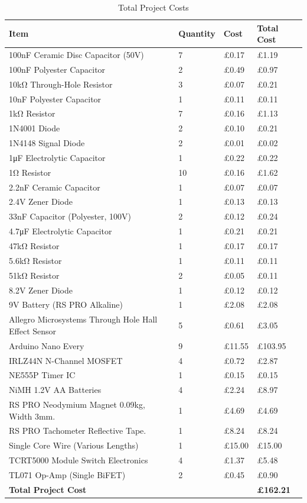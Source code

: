 \documentclass[11pt,a4paper, margin=20mm]{report}
\begin{document}
\begin{table}[H]
\centering
\caption{Total Project Costs}
\label{tab:cots_tot}
\begin{tabular}{|l ||l |l |l|} \hline 
\textbf{Item} & \textbf{Quantity} & \textbf{Cost} & \textbf{Total Cost} \\ \hline 
100nF Ceramic Disc Capacitor (50V) & 7 & £0.17 & £1.19 \\ \hline 
100nF Polyester Capacitor & 2 & £0.49 & £0.97 \\ \hline 
10kΩ Through-Hole Resistor & 3 & £0.07 & £0.21 \\ \hline 
10nF Polyester Capacitor & 1 & £0.11 & £0.11 \\ \hline 
1kΩ Resistor & 7 & £0.16 & £1.13 \\ \hline 
1N4001 Diode & 2 & £0.10 & £0.21 \\ \hline 
1N4148 Signal Diode & 2 & £0.01 & £0.02 \\ \hline 
1μF Electrolytic Capacitor & 1 & £0.22 & £0.22 \\ \hline 
1Ω Resistor & 10 & £0.16 & £1.62 \\ \hline 
2.2nF Ceramic Capacitor & 1 & £0.07 & £0.07 \\ \hline 
2.4V Zener Diode & 1 & £0.13 & £0.13 \\ \hline 
33nF Capacitor (Polyester, 100V) & 2 & £0.12 & £0.24 \\ \hline 
4.7μF Electrolytic Capacitor & 1 & £0.21 & £0.21 \\ \hline 
47kΩ Resistor  & 1 & £0.17 & £0.17 \\ \hline 
5.6kΩ Resistor & 1 & £0.11 & £0.11 \\ \hline 
51kΩ Resistor & 2 & £0.05 & £0.11 \\ \hline 
8.2V Zener Diode & 1 & £0.12 & £0.12 \\ \hline 
9V Battery (RS PRO Alkaline) & 1 & £2.08 & £2.08 \\ \hline 
Allegro Microsystems Through Hole Hall Effect Sensor & 5 & £0.61 & £3.05 \\ \hline 
Arduino Nano Every & 9 & £11.55 & £103.95 \\ \hline 
IRLZ44N N-Channel MOSFET & 4 & £0.72 & £2.87 \\ \hline 
NE555P Timer IC & 1 & £0.15 & £0.15 \\ \hline 
NiMH 1.2V AA Batteries & 4 & £2.24 & £8.97 \\ \hline 
RS PRO Neodymium Magnet 0.09kg, Width 3mm. & 1 & £4.69 & £4.69 \\ \hline 
RS PRO Tachometer Reflective Tape. & 1 & £8.24 & £8.24 \\ \hline 
Single Core Wire (Various Lengths) & 1 & £15.00 & £15.00 \\ \hline 
TCRT5000 Module Switch Electronics & 4 & £1.37 & £5.48 \\ \hline 
TL071 Op-Amp (Single BiFET) & 2 & £0.45 & £0.90 \\\hline\hline
\textbf{Total Project Cost} &  &  & \textbf{£162.21} \\ \hline

\end{tabular}

\end{table}
\end{document}
